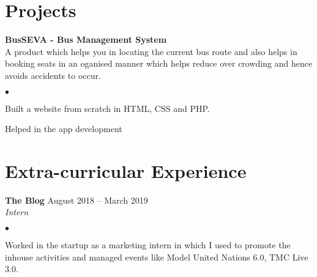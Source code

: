 \documentclass[margin,line]{res}
\newenvironment{list2}{
  \begin{list}{$\bullet$}{%
      \setlength{\itemsep}{0in}
      \setlength{\parsep}{0in} \setlength{\parskip}{0in}
      \setlength{\topsep}{0in} \setlength{\partopsep}{0in}
      \setlength{\leftmargin}{0.2in}}}{\end{list}}
\begin{document}
\begin{resume}

\section{\sc Projects}
{\bf BusSEVA - Bus Management System}\\
A product which helps you in locating the current bus route and also helps in booking seats in an oganised manner which helps reduce over crowding and hence avoids accidents to occur.\\
\begin{list2} %
    \item Built a website from scratch in HTML, CSS and PHP.\\
	\item Helped in the app development\\ 	
\end{list2} 

\section{\sc Extra-curricular Experience}
{\bf The Blog} \hfill{August 2018 -- March 2019}\\
{\em Intern}\\
\begin{list2} %
    \item Worked in the startup as a marketing intern in which I used to promote the inhouse activities and managed events like Model United Nations 6.0, TMC Live 3.0.\\
\end{list2} 


\end{resume}
\end{document}
